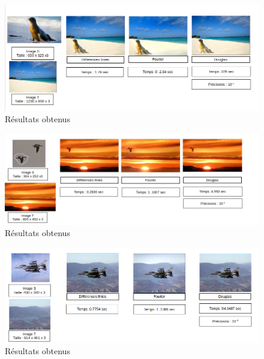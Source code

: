 \begin{figure}[H]
\centering
\includegraphics[scale=0.55]{Images/Resultats/6b.png}
\caption{Résultats obtenus}
\end{figure}

\begin{figure}[H]
\centering
\includegraphics[scale=0.55]{Images/Resultats/7b.png}
\caption{Résultats obtenus}
\end{figure}

\begin{figure}[H]
\centering
\includegraphics[scale=0.55]{Images/Resultats/8b.png}
\caption{Résultats obtenus}
\end{figure}
